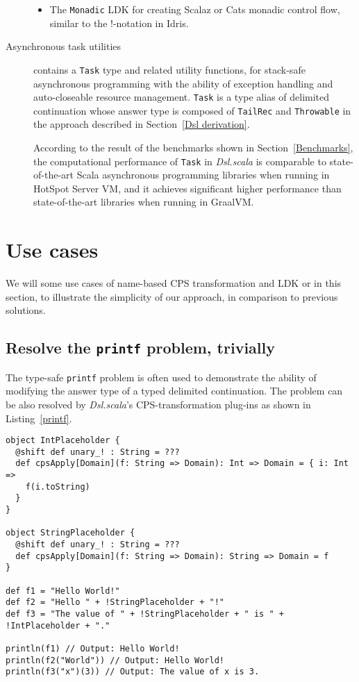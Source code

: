 \begin{description}
\begin{itemize}
    \item The \lstinline{Monadic} LDK for creating Scalaz \cite{kenji2017scalaz} or Cats \cite{typelevel2017cats} monadic control flow, similar to the !-notation in Idris\cite{brady2013idris}.
  \end{itemize}
  \item[Asynchronous task utilities] contains a \lstinline{Task} type and related utility functions, for stack-safe asynchronous programming with the ability of exception handling and auto-closeable resource management. \lstinline{Task} is a type alias of delimited continuation whose answer type is composed of \lstinline{TailRec} and \lstinline{Throwable} in the approach described in Section~\ref{Dsl derivation}.

  According to the result of the benchmarks shown in Section~\ref{Benchmarks}, the computational performance of \lstinline{Task} in \textit{Dsl.scala} is comparable to state-of-the-art Scala asynchronous programming libraries when running in HotSpot Server VM, and it achieves significant higher performance than state-of-the-art libraries when running in GraalVM.
\end{description}

\section{Use cases}

We will some use cases of name-based CPS transformation and LDK or  in this section, to illustrate the simplicity of our approach, in comparison to previous solutions.

\subsection{Resolve the \lstinline{printf} problem, trivially}\label{resolve-printf-problem}

The type-safe \lstinline{printf} problem \cite{danvy1998functional} is often used to demonstrate the ability of modifying the answer type of a typed delimited continuation. The problem can be also resolved by \textit{Dsl.scala}'s CPS-transformation plug-ins as shown in Listing~\ref{printf}.

\begin{lstlisting}[caption={A solution of the type-safe \lstinline{printf} problem in \textit{Dsl.scala}},label={printf}]
object IntPlaceholder {
  @shift def unary_! : String = ???
  def cpsApply[Domain](f: String => Domain): Int => Domain = { i: Int =>
    f(i.toString)
  }
}

object StringPlaceholder {
  @shift def unary_! : String = ???
  def cpsApply[Domain](f: String => Domain): String => Domain = f
}

def f1 = "Hello World!"
def f2 = "Hello " + !StringPlaceholder + "!"
def f3 = "The value of " + !StringPlaceholder + " is " + !IntPlaceholder + "."

println(f1) // Output: Hello World!
println(f2("World")) // Output: Hello World!
println(f3("x")(3)) // Output: The value of x is 3.
\end{lstlisting}

